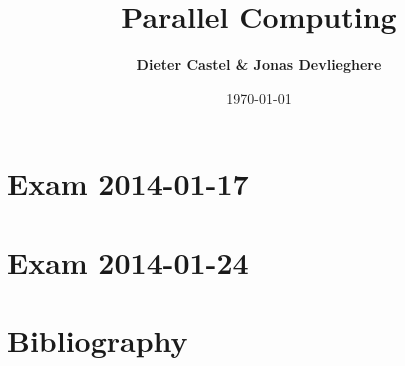 \documentclass[a4paper, 10pt, oneside]{article}
\title{Parallel Computing}
\date{\today}
\author{\textbf{Dieter Castel \& Jonas Devlieghere}}
\theoremstyle{definition}
\begin{document}
\maketitle
\newpage

\tableofcontents
\newpage

\section{Exam 2014-01-17}


\newpage
\section{Exam 2014-01-24}


\newpage
\appendix
\section{Bibliography}
\nocite{*}
\printbibliography
\end{document}
